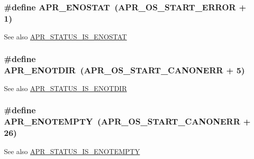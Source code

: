 \subsubsection[{\texorpdfstring{A\+P\+R\+\_\+\+E\+N\+O\+S\+T\+AT}{APR_ENOSTAT}}]{\setlength{\rightskip}{0pt plus 5cm}\#define A\+P\+R\+\_\+\+E\+N\+O\+S\+T\+AT~({\bf A\+P\+R\+\_\+\+O\+S\+\_\+\+S\+T\+A\+R\+T\+\_\+\+E\+R\+R\+OR} + 1)}\hypertarget{group__APR__Error_ga7995805cf68be1fb16f684c544e45fbe}{}\label{group__APR__Error_ga7995805cf68be1fb16f684c544e45fbe}
\begin{DoxySeeAlso}{See also}
\hyperlink{group__APR__STATUS__IS_ga1f0d21900aa879ca4866b1bf846cfd0d}{A\+P\+R\+\_\+\+S\+T\+A\+T\+U\+S\+\_\+\+I\+S\+\_\+\+E\+N\+O\+S\+T\+AT} 
\end{DoxySeeAlso}
\subsubsection[{\texorpdfstring{A\+P\+R\+\_\+\+E\+N\+O\+T\+D\+IR}{APR_ENOTDIR}}]{\setlength{\rightskip}{0pt plus 5cm}\#define A\+P\+R\+\_\+\+E\+N\+O\+T\+D\+IR~({\bf A\+P\+R\+\_\+\+O\+S\+\_\+\+S\+T\+A\+R\+T\+\_\+\+C\+A\+N\+O\+N\+E\+RR} + 5)}\hypertarget{group__APR__Error_gacfaa73cea75d14d49cc5c81e6c494330}{}\label{group__APR__Error_gacfaa73cea75d14d49cc5c81e6c494330}
\begin{DoxySeeAlso}{See also}
\hyperlink{group__APR__STATUS__IS_gace6923483aa351b05b8f41e0bdb1df60}{A\+P\+R\+\_\+\+S\+T\+A\+T\+U\+S\+\_\+\+I\+S\+\_\+\+E\+N\+O\+T\+D\+IR} 
\end{DoxySeeAlso}
\subsubsection[{\texorpdfstring{A\+P\+R\+\_\+\+E\+N\+O\+T\+E\+M\+P\+TY}{APR_ENOTEMPTY}}]{\setlength{\rightskip}{0pt plus 5cm}\#define A\+P\+R\+\_\+\+E\+N\+O\+T\+E\+M\+P\+TY~({\bf A\+P\+R\+\_\+\+O\+S\+\_\+\+S\+T\+A\+R\+T\+\_\+\+C\+A\+N\+O\+N\+E\+RR} + 26)}\hypertarget{group__APR__Error_ga01d9259eccdf0576f58b89c4ad8ca4eb}{}\label{group__APR__Error_ga01d9259eccdf0576f58b89c4ad8ca4eb}
\begin{DoxySeeAlso}{See also}
\hyperlink{group__APR__STATUS__IS_ga6cced4e794d3e7ed6dae3e53c337cc02}{A\+P\+R\+\_\+\+S\+T\+A\+T\+U\+S\+\_\+\+I\+S\+\_\+\+E\+N\+O\+T\+E\+M\+P\+TY} 
\end{DoxySeeAlso}

